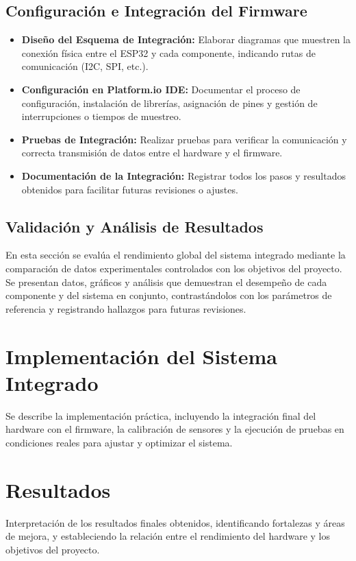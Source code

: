 \subsection{Configuración e Integración del Firmware}
\begin{itemize}
    \item \textbf{Diseño del Esquema de Integración:} Elaborar diagramas que muestren la conexión física entre el ESP32 y cada componente, indicando rutas de comunicación (I2C, SPI, etc.).
    \item \textbf{Configuración en Platform.io IDE:} Documentar el proceso de configuración, instalación de librerías, asignación de pines y gestión de interrupciones o tiempos de muestreo.
    \item \textbf{Pruebas de Integración:} Realizar pruebas para verificar la comunicación y correcta transmisión de datos entre el hardware y el firmware.
    \item \textbf{Documentación de la Integración:} Registrar todos los pasos y resultados obtenidos para facilitar futuras revisiones o ajustes.
\end{itemize}

\subsection{Validación y Análisis de Resultados}
En esta sección se evalúa el rendimiento global del sistema integrado mediante la comparación de datos experimentales controlados con los objetivos del proyecto. Se presentan datos, gráficos y análisis que demuestran el desempeño de cada componente y del sistema en conjunto, contrastándolos con los parámetros de referencia y registrando hallazgos para futuras revisiones.

\section{Implementación del Sistema Integrado}
Se describe la implementación práctica, incluyendo la integración final del hardware con el firmware, la calibración de sensores y la ejecución de pruebas en condiciones reales para ajustar y optimizar el sistema.

\section{Resultados}
Interpretación de los resultados finales obtenidos, identificando fortalezas y áreas de mejora, y estableciendo la relación entre el rendimiento del hardware y los objetivos del proyecto.
